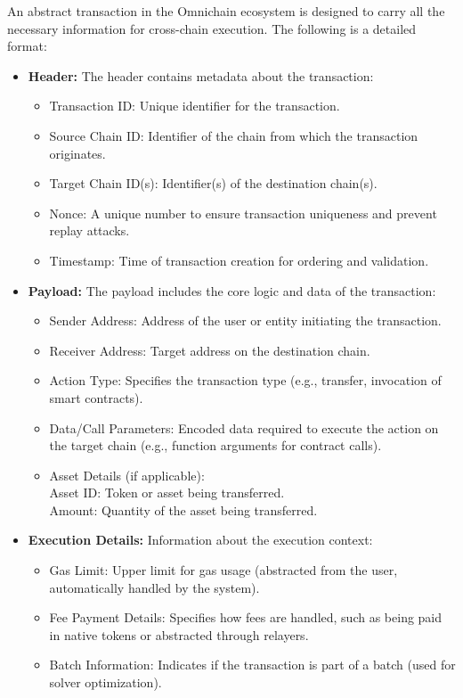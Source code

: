 An abstract transaction in the Omnichain ecosystem is designed to carry all the necessary information for cross-chain execution. The following is a detailed format:
\begin{itemize}
    \item \textbf{Header:}
    The header contains metadata about the transaction:
    \begin{itemize}
        \item \textsf{Transaction ID}: Unique identifier for the transaction.
        \item \textsf{Source Chain ID}: Identifier of the chain from which the transaction originates.
        \item \textsf{Target Chain ID(s)}: Identifier(s) of the destination chain(s).
        \item \textsf{Nonce}: A unique number to ensure transaction uniqueness and prevent replay attacks.
        \item \textsf{Timestamp}: Time of transaction creation for ordering and validation.
    \end{itemize}
    \item \textbf{Payload:}
    The payload includes the core logic and data of the transaction:
    \begin{itemize}
        \item \textsf{Sender Address}: Address of the user or entity initiating the transaction.
        \item \textsf{Receiver Address}: Target address on the destination chain.
        \item \textsf{Action Type}: Specifies the transaction type (e.g., transfer, invocation of smart contracts).
        \item \textsf{Data/Call Parameters}: Encoded data required to execute the action on the target chain (e.g., function arguments for contract calls).
        \item \textsf{Asset Details (if applicable)}:\\
            Asset ID: Token or asset being transferred.\\
            Amount: Quantity of the asset being transferred.
    \end{itemize}

    \item \textbf{Execution Details:}
    Information about the execution context:
    \begin{itemize}
        \item \textsf{Gas Limit}: Upper limit for gas usage (abstracted from the user, automatically handled by the system).
        \item \textsf{Fee Payment Details}: Specifies how fees are handled, such as being paid in native tokens or abstracted through relayers.
        \item \textsf{Batch Information}: Indicates if the transaction is part of a batch (used for solver optimization).
    \end{itemize}


\end{itemize}
